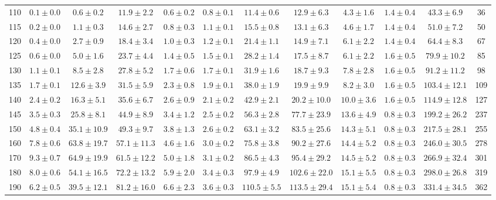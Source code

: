 \begin{table}
{\begin{center}
\begin{tabular}{l | c c | c c c c c c c | c c}
 \hline
110 & $0.1\pm0.0$ & $0.6\pm0.2$ & $11.9\pm2.2$ & $0.6\pm0.2$ & $0.8\pm0.1$ & $11.4\pm0.6$ & $12.9\pm6.3$ & $4.3\pm1.6$ & $1.4\pm0.4$ & $43.3\pm6.9$ & 36 \\
115 & $0.2\pm0.0$ & $1.1\pm0.3$ & $14.6\pm2.7$ & $0.8\pm0.3$ & $1.1\pm0.1$ & $15.5\pm0.8$ & $13.1\pm6.3$ & $4.6\pm1.7$ & $1.4\pm0.4$ & $51.0\pm7.2$ & 50 \\
120 & $0.4\pm0.0$ & $2.7\pm0.9$ & $18.4\pm3.4$ & $1.0\pm0.3$ & $1.2\pm0.1$ & $21.4\pm1.1$ & $14.9\pm7.1$ & $6.1\pm2.2$ & $1.4\pm0.4$ & $64.4\pm8.3$ & 67 \\
125 & $0.6\pm0.0$ & $5.0\pm1.6$ & $23.7\pm4.4$ & $1.4\pm0.5$ & $1.5\pm0.1$ & $28.2\pm1.4$ & $17.5\pm8.7$ & $6.1\pm2.2$ & $1.6\pm0.5$ & $79.9\pm10.2$ & 85 \\
130 & $1.1\pm0.1$ & $8.5\pm2.8$ & $27.8\pm5.2$ & $1.7\pm0.6$ & $1.7\pm0.1$ & $31.9\pm1.6$ & $18.7\pm9.3$ & $7.8\pm2.8$ & $1.6\pm0.5$ & $91.2\pm11.2$ & 98 \\
135 & $1.7\pm0.1$ & $12.6\pm3.9$ & $31.5\pm5.9$ & $2.3\pm0.8$ & $1.9\pm0.1$ & $38.0\pm1.9$ & $19.9\pm9.9$ & $8.2\pm3.0$ & $1.6\pm0.5$ & $103.4\pm12.1$ & 109 \\
140 & $2.4\pm0.2$ & $16.3\pm5.1$ & $35.6\pm6.7$ & $2.6\pm0.9$ & $2.1\pm0.2$ & $42.9\pm2.1$ & $20.2\pm10.0$ & $10.0\pm3.6$ & $1.6\pm0.5$ & $114.9\pm12.8$ & 127 \\
145 & $3.5\pm0.3$ & $25.8\pm8.1$ & $44.9\pm8.9$ & $3.4\pm1.2$ & $2.5\pm0.2$ & $56.3\pm2.8$ & $77.7\pm23.9$ & $13.6\pm4.9$ & $0.8\pm0.3$ & $199.2\pm26.2$ & 237 \\
150 & $4.8\pm0.4$ & $35.1\pm10.9$ & $49.3\pm9.7$ & $3.8\pm1.3$ & $2.6\pm0.2$ & $63.1\pm3.2$ & $83.5\pm25.6$ & $14.3\pm5.1$ & $0.8\pm0.3$ & $217.5\pm28.1$ & 255 \\
160 & $7.8\pm0.6$ & $63.8\pm19.7$ & $57.1\pm11.3$ & $4.6\pm1.6$ & $3.0\pm0.2$ & $75.8\pm3.8$ & $90.2\pm27.6$ & $14.4\pm5.2$ & $0.8\pm0.3$ & $246.0\pm30.5$ & 278 \\
170 & $9.3\pm0.7$ & $64.9\pm19.9$ & $61.5\pm12.2$ & $5.0\pm1.8$ & $3.1\pm0.2$ & $86.5\pm4.3$ & $95.4\pm29.2$ & $14.5\pm5.2$ & $0.8\pm0.3$ & $266.9\pm32.4$ & 301 \\
180 & $8.0\pm0.6$ & $54.1\pm16.5$ & $72.2\pm13.2$ & $5.9\pm2.0$ & $3.4\pm0.3$ & $97.9\pm4.9$ & $102.6\pm22.0$ & $15.1\pm5.5$ & $0.8\pm0.3$ & $298.0\pm26.8$ & 319 \\
190 & $6.2\pm0.5$ & $39.5\pm12.1$ & $81.2\pm16.0$ & $6.6\pm2.3$ & $3.6\pm0.3$ & $110.5\pm5.5$ & $113.5\pm29.4$ & $15.1\pm5.4$ & $0.8\pm0.3$ & $331.4\pm34.5$ & 362 \\

\end{tabular}
\end{center}}
\end{table}
